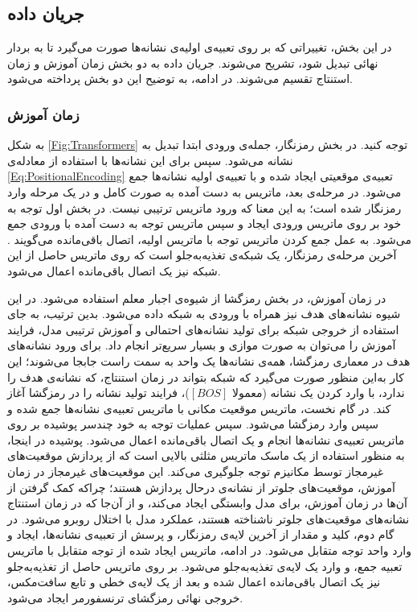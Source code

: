 \subsection{جریان داده}
در این بخش، تغییراتی که بر روی تعبیه‌ی اولیه‌ی نشانه‌ها صورت می‌گیرد تا به بردار نهائی تبدیل شود، تشریح می‌شوند. جریان داده به دو بخش زمان آموزش و زمان استنتاج تقسیم می‌شوند. در ادامه، به توضیح این دو بخش پرداخته می‌شود.
\subsubsection{زمان آموزش}
به شکل \ref{Fig:Transformers} توجه کنید. در بخش رمزنگار، جمله‌ی ورودی ابتدا تبدیل به نشانه می‌شود. سپس برای این نشانه‌ها با استفاده از معادله‌ی \ref{Eq:PositionalEncoding} تعبیه‌ی موقعیتی ایجاد شده و با تعبیه‌ی اولیه نشانه‌ها جمع می‌شود. در مرحله‌ی بعد، ماتریس به دست آمده به صورت کامل و در یک مرحله وارد رمزنگار شده است؛ به این معنا که ورود ماتریس ترتیبی نیست. در بخش اول توجه به خود بر روی ماتریس ورودی ایجاد و سپس ماتریس توجه به دست آمده با ورودی جمع می‌شود. به عمل جمع کردن ماتریس توجه با ماتریس اولیه، اتصال باقی‌مانده می‌گویند \cite{residualconnection}. آخرین مرحله‌ی رمزنگار، یک شبکه‌ی تغذیه‌به‌جلو است که روی ماتریس حاصل از این شبکه نیز یک اتصال باقی‌مانده اعمال می‌شود.


در زمان آموزش، در بخش رمزگشا از شیوه‌ی اجبار معلم استفاده می‌شود. در این شیوه نشانه‌های هدف نیز همراه با ورودی به شبکه داده می‌شود. بدین ترتیب، به جای استفاده از خروجی شبکه برای تولید نشانه‌های احتمالی و آموزش ترتیبی مدل، فرایند آموزش را می‌توان به صورت موازی و بسیار سریع‌تر انجام داد. برای ورود نشانه‌های هدف در معماری رمزگشا، همه‌ی نشانه‌ها یک واحد به سمت راست جابجا می‌شوند؛ این کار به‌این منظور صورت می‌گیرد که شبکه بتواند در زمان استنتاج، که نشانه‌ی هدف را ندارد، با وارد کردن یک نشانه (معمولا $[BOS]$)، فرایند تولید نشانه را در رمزگشا آغاز کند. در گام نخست، ماتریس موقعیت مکانی با ماتریس تعبیه‌ی نشانه‌ها جمع شده و سپس وارد رمزگشا می‌شود. سپس عملیات توجه به خود چندسر پوشیده بر روی ماتریس تعبیه‌ی نشانه‌ها انجام و یک اتصال باقی‌مانده اعمال می‌شود. پوشیده در اینجا، به منظور استفاده از یک ماسک ماتریس مثلثی بالایی است که از پردازش موقعیت‌های غیرمجاز توسط مکانیزم توجه جلوگیری می‌کند. این موقعیت‌های غیرمجاز در زمان آموزش، موقعیت‌های جلوتر از نشانه‌ی درحال پردازش هستند؛ چراکه کمک گرفتن از آن‌ها در زمان آموزش، برای مدل وابستگی ایجاد می‌کند، و از آن‌جا که در زمان استنتاج نشانه‌های موقعیت‌های جلوتر ناشناخته هستند، عملکرد مدل با اختلال روبرو می‌شود.
در گام دوم، کلید و مقدار از آخرین لایه‌ی رمزنگار، و پرسش از تعبیه‌ی نشانه‌ها، ایجاد و وارد واحد توجه متقابل می‌شود. در ادامه، ماتریس ایجاد شده از توجه متقابل با ماتریس تعبیه جمع، و وارد یک لایه‌ی تغذیه‌به‌جلو می‌شود. بر روی ماتریس حاصل از تغذیه‌به‌جلو نیز یک اتصال باقی‌مانده اعمال شده و بعد از یک لایه‌ی خطی و تابع سافت‌مکس، خروجی نهائی رمزگشای ترنسفورمر ایجاد می‌شود.

